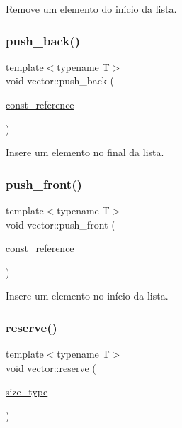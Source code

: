 Remove um elemento do início da lista. 

\mbox{\label{classsc_1_1vector_af84bdcc9188e61f5ea1d2eecc6b72bee}} 
\subsubsection{\texorpdfstring{push\+\_\+back()}{push\_back()}}
{\footnotesize\ttfamily template$<$typename T$>$ \\
void vector\+::push\+\_\+back (\begin{DoxyParamCaption}\item[{\hyperlink{classsc_1_1vector_a8da2b1a11b069241100f9b2e14f481a0}{const\+\_\+reference}}]{ }\end{DoxyParamCaption})}



Insere um elemento no final da lista. 

\mbox{\label{classsc_1_1vector_a1e5bdb328b9843ac252fd7f7a2c44e86}} 
\subsubsection{\texorpdfstring{push\+\_\+front()}{push\_front()}}
{\footnotesize\ttfamily template$<$typename T$>$ \\
void vector\+::push\+\_\+front (\begin{DoxyParamCaption}\item[{\hyperlink{classsc_1_1vector_a8da2b1a11b069241100f9b2e14f481a0}{const\+\_\+reference}}]{ }\end{DoxyParamCaption})}



Insere um elemento no início da lista. 

\mbox{\label{classsc_1_1vector_a58951f9d3202027e0de28e8f9e0eb542}} 
\subsubsection{\texorpdfstring{reserve()}{reserve()}}
{\footnotesize\ttfamily template$<$typename T$>$ \\
void vector\+::reserve (\begin{DoxyParamCaption}\item[{\hyperlink{classsc_1_1vector_a48bf37ba1a6d0c13504414d86e27c399}{size\+\_\+type}}]{ }\end{DoxyParamCaption})}




